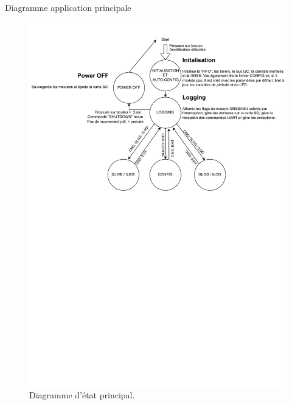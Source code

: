 \documentclass{beamer}
\begin{document}

\begin{frame}{Diagramme application principale}
	\begin{figure}[h]
		\centering
		\includegraphics[width=1\linewidth]{../figures/code/diagrammes/state_app}
		\caption{Diagramme d'état principal.}
		\label{fig:stateapp}
	\end{figure}
\end{frame}
\end{document}
